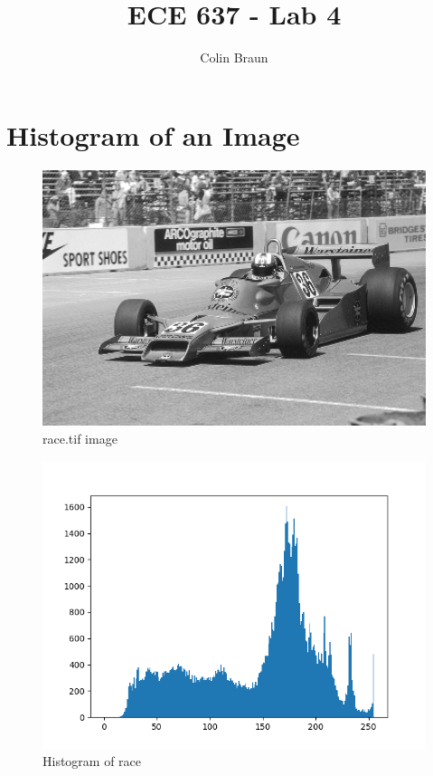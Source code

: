 \documentclass{article}
\title{ECE 637 - Lab 4}
\author{Colin Braun}
\begin{document}
\maketitle

\section{Histogram of an Image}
\begin{figure}[H]
    \centering
    \includegraphics[width=1\textwidth]{../race.png}
    \caption{race.tif image}
\end{figure}
\begin{figure}[H]
    \centering
    \includegraphics[width=1\textwidth]{../race-histogram.png}
    \caption{Histogram of race}
\end{figure}
\end{document}
